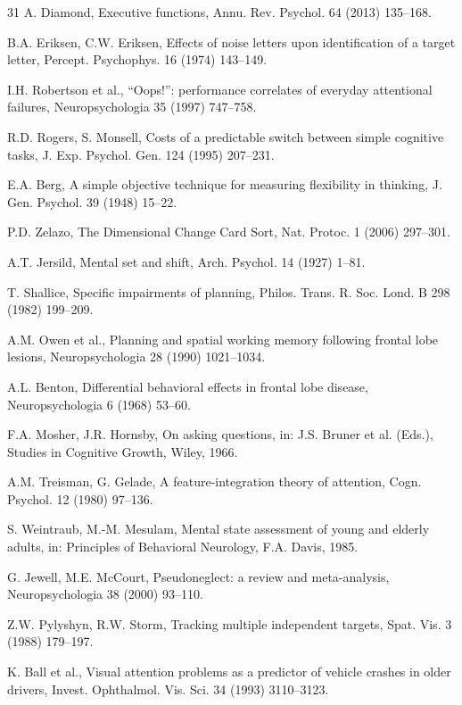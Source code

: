 \documentclass[11pt,a4paper]{article}
\begin{document}
\begin{thebibliography}{31}
A. Diamond,
Executive functions,
Annu. Rev. Psychol. 64 (2013) 135--168.

B.A. Eriksen, C.W. Eriksen,
Effects of noise letters upon identification of a target letter,
Percept. Psychophys. 16 (1974) 143--149.

I.H. Robertson et al.,
``Oops!'': performance correlates of everyday attentional failures,
Neuropsychologia 35 (1997) 747--758.

R.D. Rogers, S. Monsell,
Costs of a predictable switch between simple cognitive tasks,
J. Exp. Psychol. Gen. 124 (1995) 207--231.

E.A. Berg,
A simple objective technique for measuring flexibility in thinking,
J. Gen. Psychol. 39 (1948) 15--22.

P.D. Zelazo,
The Dimensional Change Card Sort,
Nat. Protoc. 1 (2006) 297--301.

A.T. Jersild,
Mental set and shift,
Arch. Psychol. 14 (1927) 1--81.

T. Shallice,
Specific impairments of planning,
Philos. Trans. R. Soc. Lond. B 298 (1982) 199--209.

A.M. Owen et al.,
Planning and spatial working memory following frontal lobe lesions,
Neuropsychologia 28 (1990) 1021--1034.

A.L. Benton,
Differential behavioral effects in frontal lobe disease,
Neuropsychologia 6 (1968) 53--60.

F.A. Mosher, J.R. Hornsby,
On asking questions,
in: J.S. Bruner et al. (Eds.),
Studies in Cognitive Growth,
Wiley, 1966.

A.M. Treisman, G. Gelade,
A feature-integration theory of attention,
Cogn. Psychol. 12 (1980) 97--136.

S. Weintraub, M.-M. Mesulam,
Mental state assessment of young and elderly adults,
in: Principles of Behavioral Neurology,
F.A. Davis, 1985.

G. Jewell, M.E. McCourt,
Pseudoneglect: a review and meta-analysis,
Neuropsychologia 38 (2000) 93--110.

Z.W. Pylyshyn, R.W. Storm,
Tracking multiple independent targets,
Spat. Vis. 3 (1988) 179--197.

K. Ball et al.,
Visual attention problems as a predictor of vehicle crashes in older drivers,
Invest. Ophthalmol. Vis. Sci. 34 (1993) 3110--3123.

\end{thebibliography}

\normalsize
\end{document}
